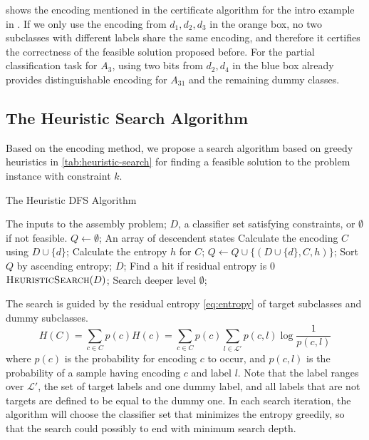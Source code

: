 \documentclass[sigplan,10pt,review]{acmart}\settopmatter{printfolios=true,printccs=false,printacmref=false}
\begin{document}
 shows the encoding mentioned in the certificate algorithm for the intro example in .
If we only use the encoding from $d_1, d_2, d_3$ in the orange box, no two subclasses with different labels share the same encoding, and therefore it certifies the correctness of the feasible solution proposed before.
For the partial classification task for $A_3$, using two bits from $d_2, d_4$ in the blue box already provides distinguishable encoding for $A_{31}$ and the remaining dummy classes.


\subsection{The Heuristic Search Algorithm}
\label{sec:assembly-algorithm}
Based on the encoding method, we propose a search algorithm based on greedy heuristics in \cref{tab:heuristic-search} for finding a feasible solution to the problem instance with constraint $k$.

\begin{algorithm}[h]
    \caption{The Heuristic DFS Algorithm}
    \label{tab:heuristic-search}
    \begin{algorithmic}[1]
      \Require The inputs to the assembly problem;
      \Ensure $D$, a classifier set satisfying constraints, or $\emptyset$ if not feasible.
        \State $Q \gets \emptyset$; \Comment An array of descendent states
          \State Calculate the encoding $C$ using $D \cup \{d\}$;
          \State Calculate the entropy $h$ for $C$;
          \State $Q \gets Q \cup \{(D \cup \{d\}, C, h)\}$;
        \EndFor
        \State Sort $Q$ by ascending entropy;
            \State \Return $D$; \Comment Find a hit if residual entropy is 0
          \EndIf
            \State $\Call{HeuristicSearch}{D}$; \Comment Search deeper level
          \EndIf
        \EndFor
        \State \Return $\emptyset$;
      \EndFunction
    \end{algorithmic}
\end{algorithm}  

The search is guided by the residual entropy \eqref{eq:entropy} of target subclasses and dummy subclasses.
\begin{equation}
	H(C) = \sum_{c \in C} p(c)H(c) = \sum_{c \in C} p(c)\sum_{l \in \mathcal{L}'} p(c, l)\log\frac{1}{p(c, l)}
	\label{eq:entropy}
\end{equation}
where $p(c)$ is the probability for encoding $c$ to occur, and $p(c, l)$ is the probability of a sample having encoding $c$ and label $l$.
Note that the label ranges over $\mathcal{L}'$, the set of target labels and one dummy label, and all labels that are not targets are defined to be equal to the dummy one.
In each search iteration, the algorithm will choose the classifier set that minimizes the entropy greedily, so that the search could possibly to end with minimum search depth.
\end{document}
